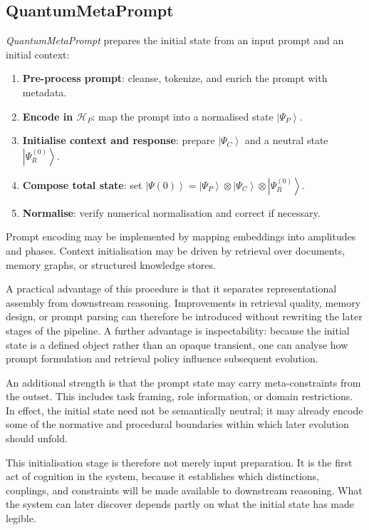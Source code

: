 \documentclass[12pt]{article}
\newcommand{\ket}[1]{\left|#1\right\rangle}
\begin{document}
\subsection{QuantumMetaPrompt}
\textit{QuantumMetaPrompt} prepares the initial state from an input prompt and an initial context:
\begin{enumerate}[leftmargin=2em]
    \item \textbf{Pre-process prompt}: cleanse, tokenize, and enrich the prompt with metadata.
    \item \textbf{Encode in $\mathcal{H}_P$}: map the prompt into a normalised state $\ket{\Psi_P}$.
    \item \textbf{Initialise context and response}: prepare $\ket{\Psi_C}$ and a neutral state $\ket{\Psi_R^{(0)}}$.
    \item \textbf{Compose total state}: set $\ket{\Psi(0)} = \ket{\Psi_P} \otimes \ket{\Psi_C} \otimes \ket{\Psi_R^{(0)}}$.
    \item \textbf{Normalise}: verify numerical normalisation and correct if necessary.
\end{enumerate}
Prompt encoding may be implemented by mapping embeddings into amplitudes and phases. Context initialisation may be driven by retrieval over documents, memory graphs, or structured knowledge stores.

A practical advantage of this procedure is that it separates representational assembly from downstream reasoning. Improvements in retrieval quality, memory design, or prompt parsing can therefore be introduced without rewriting the later stages of the pipeline. A further advantage is inspectability: because the initial state is a defined object rather than an opaque transient, one can analyse how prompt formulation and retrieval policy influence subsequent evolution.

An additional strength is that the prompt state may carry meta-constraints from the outset. This includes task framing, role information, or domain restrictions. In effect, the initial state need not be semantically neutral; it may already encode some of the normative and procedural boundaries within which later evolution should unfold.

This initialisation stage is therefore not merely input preparation. It is the first act of cognition in the system, because it establishes which distinctions, couplings, and constraints will be made available to downstream reasoning. What the system can later discover depends partly on what the initial state has made legible.
\end{document}
